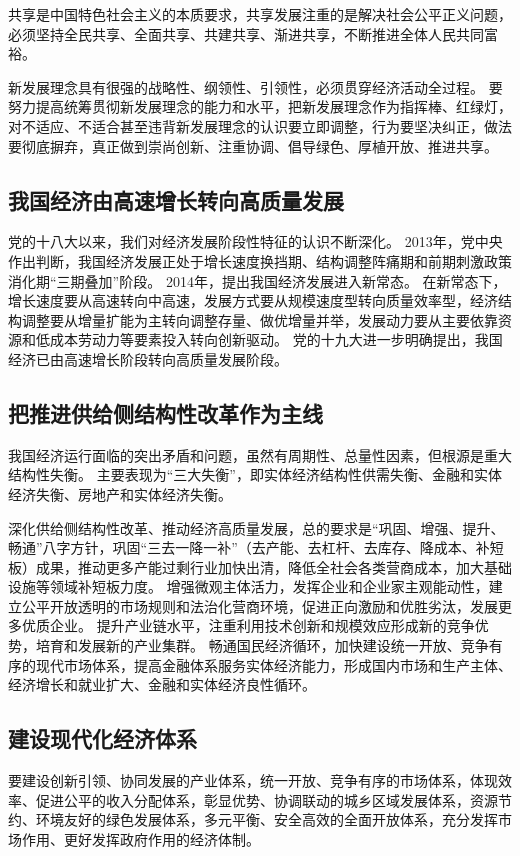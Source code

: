 \documentclass[a4paper, UTF8]{ctexart}
\begin{document}
    共享是中国特色社会主义的本质要求，共享发展注重的是解决社会公平正义问题，必须坚持全民共享、全面共享、共建共享、渐进共享，不断推进全体人民共同富裕。

    新发展理念具有很强的战略性、纲领性、引领性，必须贯穿经济活动全过程。
    要努力提高统筹贯彻新发展理念的能力和水平，把新发展理念作为指挥棒、红绿灯，对不适应、不适合甚至违背新发展理念的认识要立即调整，行为要坚决纠正，做法要彻底摒弃，真正做到崇尚创新、注重协调、倡导绿色、厚植开放、推进共享。

    \subsection{我国经济由高速增长转向高质量发展}
    党的十八大以来，我们对经济发展阶段性特征的认识不断深化。
    2013年，党中央作出判断，我国经济发展正处于增长速度换挡期、结构调整阵痛期和前期刺激政策消化期“三期叠加”阶段。
    2014年，提出我国经济发展进入新常态。
    在新常态下，增长速度要从高速转向中高速，发展方式要从规模速度型转向质量效率型，经济结构调整要从增量扩能为主转向调整存量、做优增量并举，发展动力要从主要依靠资源和低成本劳动力等要素投入转向创新驱动。
    党的十九大进一步明确提出，我国经济已由高速增长阶段转向高质量发展阶段。

    \subsection{把推进供给侧结构性改革作为主线}
    我国经济运行面临的突出矛盾和问题，虽然有周期性、总量性因素，但根源是重大结构性失衡。
    主要表现为“三大失衡”，即实体经济结构性供需失衡、金融和实体经济失衡、房地产和实体经济失衡。

    深化供给侧结构性改革、推动经济高质量发展，总的要求是“巩固、增强、提升、畅通”八字方针，巩固“三去一降一补”（去产能、去杠杆、去库存、降成本、补短板）成果，推动更多产能过剩行业加快出清，降低全社会各类营商成本，加大基础设施等领域补短板力度。
    增强微观主体活力，发挥企业和企业家主观能动性，建立公平开放透明的市场规则和法治化营商环境，促进正向激励和优胜劣汰，发展更多优质企业。
    提升产业链水平，注重利用技术创新和规模效应形成新的竞争优势，培育和发展新的产业集群。
    畅通国民经济循环，加快建设统一开放、竞争有序的现代市场体系，提高金融体系服务实体经济能力，形成国内市场和生产主体、经济增长和就业扩大、金融和实体经济良性循环。

    \subsection{建设现代化经济体系}
    要建设创新引领、协同发展的产业体系，统一开放、竞争有序的市场体系，体现效率、促进公平的收入分配体系，彰显优势、协调联动的城乡区域发展体系，资源节约、环境友好的绿色发展体系，多元平衡、安全高效的全面开放体系，充分发挥市场作用、更好发挥政府作用的经济体制。
\end{document}
